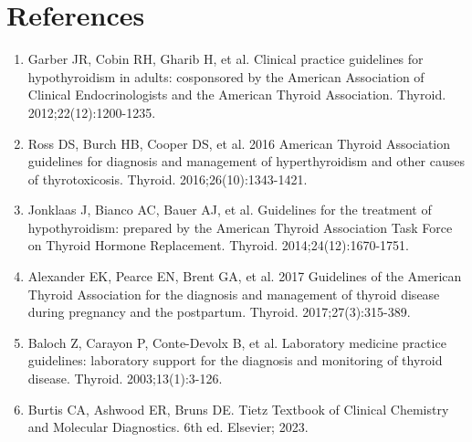\section*{References}
\begin{enumerate}
  \item Garber JR, Cobin RH, Gharib H, et al. Clinical practice guidelines for hypothyroidism in adults: cosponsored by the American Association of Clinical Endocrinologists and the American Thyroid Association. Thyroid. 2012;22(12):1200-1235.
  \item Ross DS, Burch HB, Cooper DS, et al. 2016 American Thyroid Association guidelines for diagnosis and management of hyperthyroidism and other causes of thyrotoxicosis. Thyroid. 2016;26(10):1343-1421.
  \item Jonklaas J, Bianco AC, Bauer AJ, et al. Guidelines for the treatment of hypothyroidism: prepared by the American Thyroid Association Task Force on Thyroid Hormone Replacement. Thyroid. 2014;24(12):1670-1751.
  \item Alexander EK, Pearce EN, Brent GA, et al. 2017 Guidelines of the American Thyroid Association for the diagnosis and management of thyroid disease during pregnancy and the postpartum. Thyroid. 2017;27(3):315-389.
  \item Baloch Z, Carayon P, Conte-Devolx B, et al. Laboratory medicine practice guidelines: laboratory support for the diagnosis and monitoring of thyroid disease. Thyroid. 2003;13(1):3-126.
  \item Burtis CA, Ashwood ER, Bruns DE. Tietz Textbook of Clinical Chemistry and Molecular Diagnostics. 6th ed. Elsevier; 2023.
\end{enumerate}

\clearpage

